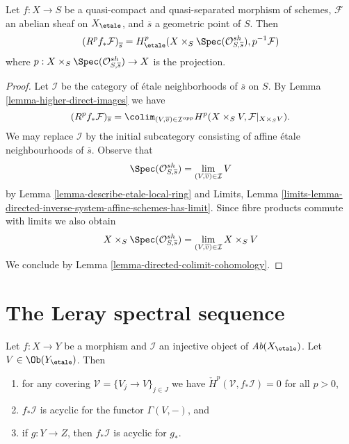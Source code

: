 \begin{theorem}
\label{theorem-higher-direct-images}
Let $f: X \to S$ be a quasi-compact and quasi-separated morphism of schemes,
$\mathcal{F}$ an abelian sheaf on $X_\etale$, and $\overline{s}$ a
geometric point of $S$. Then
$$
\left(R^pf_* \mathcal{F}\right)_{\overline{s}} =
H_\etale^p( X \times_S \Spec(\mathcal{O}_{S, \overline{s}}^{sh}),
p^{-1}\mathcal{F})
$$
where $p : X \times_S \Spec(\mathcal{O}_{S, \overline{s}}^{sh}) \to X$
is the projection.
\end{theorem}

\begin{proof}
Let $\mathcal{I}$ be the category of \'etale neighborhoods of $\overline{s}$
on $S$. By Lemma \ref{lemma-higher-direct-images}
we have
$$
(R^pf_*\mathcal{F})_{\overline{s}} =
\colim_{(V, \overline{v}) \in \mathcal{I}^{opp}}
H^p(X \times_S V, \mathcal{F}|_{X \times_S V}).
$$
We may replace $\mathcal{I}$ by the initial subcategory consisting
of affine \'etale neighbourhoods of $\overline{s}$. Observe that
$$
\Spec(\mathcal{O}_{S, \overline{s}}^{sh}) =
\lim_{(V, \overline{v}) \in \mathcal{I}} V
$$
by Lemma \ref{lemma-describe-etale-local-ring} and
Limits, Lemma
\ref{limits-lemma-directed-inverse-system-affine-schemes-has-limit}.
Since fibre products commute with limits we also obtain
$$
X \times_S \Spec(\mathcal{O}_{S, \overline{s}}^{sh}) =
\lim_{(V, \overline{v}) \in \mathcal{I}} X \times_S V
$$
We conclude by Lemma \ref{lemma-directed-colimit-cohomology}.
\end{proof}





\section{The Leray spectral sequence}
\label{section-leray}

\begin{lemma}
\label{lemma-prepare-leray}
Let $f: X \to Y$ be a morphism and $\mathcal{I}$ an injective object of
$\textit{Ab}(X_\etale)$. Let $V \in \Ob(Y_\etale)$. Then
\begin{enumerate}
\item for any covering $\mathcal{V} = \{V_j\to V\}_{j \in J}$ we have
$\check H^p(\mathcal{V}, f_*\mathcal{I}) = 0$ for all $p > 0$,
\item $f_*\mathcal{I}$ is acyclic for the functor $\Gamma(V, -)$, and
\item if $g : Y \to Z$, then $f_*\mathcal{I}$ is acyclic for $g_*$.
\end{enumerate}
\end{lemma}

